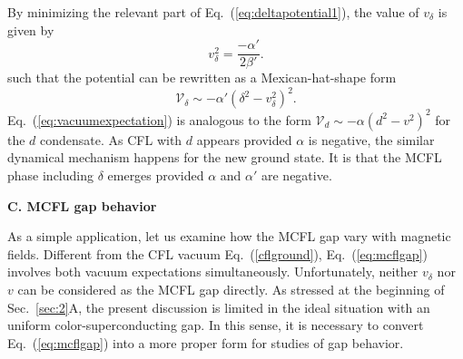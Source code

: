 \documentclass[12pt]{article}
\begin{document}
By minimizing the relevant part of Eq.~(\ref{eq:deltapotential1}), the value of $v_\delta$ is given by
\begin{equation}
\label{eq:vacuumexpectation}
v_\delta^2 = \frac{- \alpha'} {2\beta'}.
\end{equation}
such that the potential can be rewritten as a Mexican-hat-shape form
\begin{equation}
\label{eq:deltapotential}
\mathcal{V}_\delta \sim - \alpha'(\delta^2 - v_\delta^2)^2.
\end{equation}
Eq.~(\ref{eq:vacuumexpectation}) is analogous to the form $\mathcal{V}_d \sim - \alpha (d^2 - v^2)^2$
for the $d$ condensate.
As CFL with $d$ appears provided $\alpha$ is negative, the similar dynamical mechanism happens for
the new ground state. It is that the MCFL phase including $\delta$ emerges provided $\alpha$ and
$\alpha'$ are negative.

\vspace{0.2cm}
\textbf{C. MCFL gap behavior}
\vspace{0.2cm}

As a simple application, let us examine how the MCFL gap vary with magnetic fields.
Different from the CFL vacuum Eq.~(\ref{cflground}), Eq.~(\ref{eq:mcflgap}) involves both vacuum
expectations simultaneously. Unfortunately, neither $v_\delta$ nor $v$ can be considered as the
MCFL gap directly. As stressed at the beginning of Sec.~\ref{sec:2}A, the present discussion is
limited in the ideal situation with an uniform color-superconducting gap. In this sense, it is
necessary to convert Eq.~(\ref{eq:mcflgap}) into a more proper form for studies of gap behavior.
\end{document}
